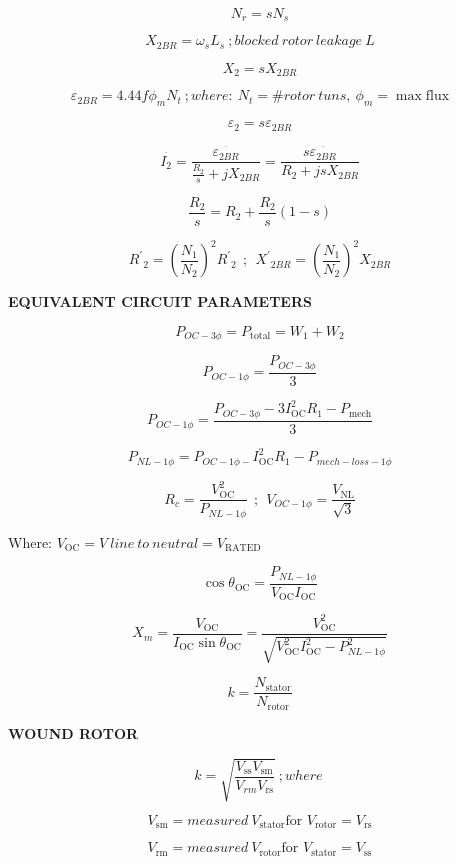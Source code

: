 \begin{multicols}{2}
	\[N_{r} = sN_{s}\]
	
	\[X_{2BR} = \omega_{s}L_{s}\ ;blocked\ rotor\ leakage\ L\]
	
	\[X_{2} = sX_{2BR}\]
	
	\[\varepsilon_{2BR} = 4.44f\phi_{m}N_{t}\ ;where:\ N_{t} = \# rotor\ tuns,\ \phi_{m} = \max\text{flux}\]
	
	\[\varepsilon_{2} = s\varepsilon_{2BR}\]
	
	\[\overset{\overline{}}{I_{2}} = \frac{\overset{\overline{}}{\varepsilon_{2BR}}}{\frac{R_{2}}{s} + jX_{2BR}} = \frac{s\overset{\overline{}}{\varepsilon_{2BR}}}{R_{2} + jsX_{2BR}}\]
	
	\[\frac{R_{2}}{s} = R_{2} + \frac{R_{2}}{s}(1 - s)\]
	
	\[{R^{'}}_{2} = \left( \frac{N_{1}}{N_{2}} \right)^{2}{R^{'}}_{2}\ \ ;\ \ {X^{'}}_{2BR} = \left( \frac{N_{1}}{N_{2}} \right)^{2}X_{2BR}\]
	
	\textbf{EQUIVALENT CIRCUIT PARAMETERS}
	
	\[P_{OC - 3\phi} = P_{\text{total}} = W_{1} + W_{2}\]
	
	\[P_{OC - 1\phi} = \frac{P_{OC - 3\phi}}{3}\]
	
	\[P_{OC - 1\phi} = \frac{P_{OC - 3\phi} - 3I_{\text{OC}}^{2}R_{1} - P_{\text{mech}}}{3}\]
	
	\[P_{NL - 1\phi} = P_{OC - 1\phi -}I_{\text{OC}}^{2}R_{1} - P_{mech - loss - 1\phi}\]
	
	\[R_{c} = \frac{V_{\text{OC}}^{2}}{P_{NL - 1\phi}}\ \ ;\ \ V_{OC - 1\phi} = \frac{V_{\text{NL}}}{\sqrt{3}}\]
	
	Where: \(V_{\text{OC}} = V\ line\ to\ neutral = V_{\text{RATED}}\)
	
	\[\cos{\theta_{\text{OC}} = \frac{P_{NL - 1\phi}}{V_{\text{OC}}I_{\text{OC}}}}\]
	
	\[X_{m} = \frac{V_{\text{OC}}}{I_{\text{OC}}\sin\theta_{\text{OC}}} = \frac{V_{\text{OC}}^{2}}{\sqrt{V_{\text{OC}}^{2}I_{\text{OC}}^{2} - P_{NL - 1\phi}^{2}}}\]
	
	\[k = \frac{N_{\text{stator}}}{N_{\text{rotor}}}\]
	
	\textbf{WOUND ROTOR}
	
	\[k = \sqrt{\frac{V_{\text{ss}}V_{\text{sm}}}{V_{rm}V_{\text{rs}}}}\ ;where\ \]
	
	\[V_{\text{sm}} = measured\ V_{\text{stator}}\text{for\ }V_{\text{rotor}} = V_{\text{rs}}\]
	
	\[V_{\text{rm}} = measured\ V_{\text{rotor}}\text{for\ }V_{\text{stator}} = V_{\text{ss}}\]
	

\end{multicols}
